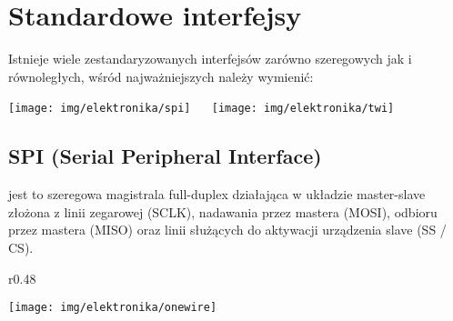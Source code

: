 % 
% 
% 
% 

\section{Standardowe interfejsy}

Istnieje wiele zestandaryzowanych interfejsów zarówno szeregowych jak i równoległych, wśród najważniejszych należy wymienić:

\begin{center} \texttt{[image: img/elektronika/spi]}    \texttt{[image: img/elektronika/twi]} \end{center}

\subsection{SPI (Serial Peripheral Interface)}
    jest to szeregowa magistrala full-duplex działająca w układzie master-slave złożona z linii zegarowej (SCLK), nadawania przez mastera (MOSI), odbioru przez mastera (MISO) oraz linii służących do aktywacji urządzenia slave (SS / CS). 

\begin{wrapfigure}{r}{0.48\textwidth} \begin{center} \vspace{-20pt} \texttt{[image: img/elektronika/onewire]} \vspace{-20pt} \end{center} \end{wrapfigure}

